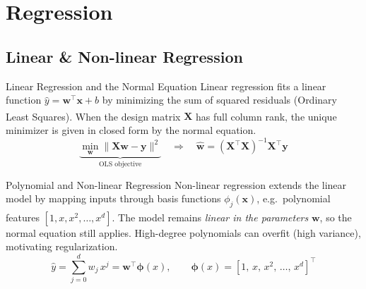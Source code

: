 \section{Regression}

\subsection{Linear \& Non-linear Regression}

\begin{v3topic}{Linear Regression and the Normal Equation}
    Linear regression fits a linear function $\hat{y} = \mathbf{w}^\top \mathbf{x} + b$ by minimizing the sum of squared residuals (Ordinary Least Squares)\textsuperscript{\cite[][pp.~86--90]{iiiCourseMachineLearning}}. When the design matrix $\mathbf{X}$ has full column rank, the unique minimizer is given in closed form by the normal equation.
\visualseparator
    \begin{equation}
        \underbrace{\min_{\mathbf{w}} \|\mathbf{X}\mathbf{w} - \mathbf{y}\|^2}_{\text{OLS objective}}
        \quad\Longrightarrow\quad
        \hat{\mathbf{w}} = (\mathbf{X}^\top\mathbf{X})^{-1}\mathbf{X}^\top\mathbf{y}
    \end{equation}

\end{v3topic}
\begin{v3topic}{Polynomial and Non-linear Regression}
    Non-linear regression extends the linear model by mapping inputs through basis functions $\phi_j(\mathbf{x})$, e.g.\ polynomial features $[1, x, x^2, \ldots, x^d]$\textsuperscript{\cite[][pp.~90--97]{iiiCourseMachineLearning}}. The model remains \emph{linear in the parameters} $\mathbf{w}$, so the normal equation still applies. High-degree polynomials can overfit (high variance), motivating regularization.
\visualseparator
    \begin{equation}
        \hat{y} = \sum_{j=0}^{d} w_j\, x^j = \mathbf{w}^\top \boldsymbol{\phi}(x),
        \qquad \boldsymbol{\phi}(x) = [1,\, x,\, x^2,\, \ldots,\, x^d]^\top
    \end{equation}
\end{v3topic}

